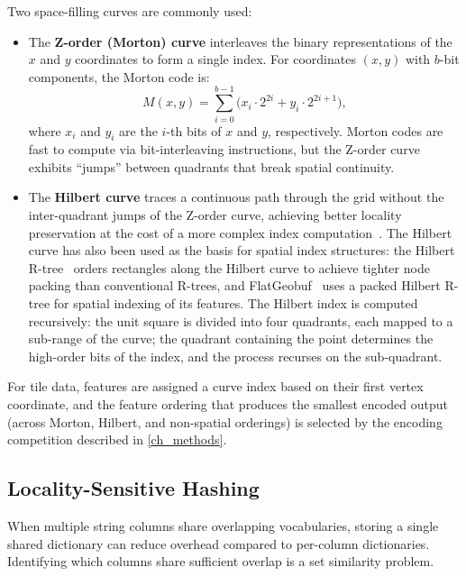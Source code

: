 Two space-filling curves are commonly used:

\begin{itemize}
    \item The \textbf{Z-order (Morton) curve} interleaves the binary representations of the $x$ and $y$ coordinates to form a single index.
    For coordinates $(x, y)$ with $b$-bit components, the Morton code is:
    \begin{equation}\label{eq:morton}
        M(x, y) = \sum_{i=0}^{b-1} \bigl( x_i \cdot 2^{2i} + y_i \cdot 2^{2i+1} \bigr),
    \end{equation}
    where $x_i$ and $y_i$ are the $i$-th bits of $x$ and $y$, respectively.
    Morton codes are fast to compute via bit-interleaving instructions, but the Z-order curve exhibits \enquote{jumps} between quadrants that break spatial continuity.

    \item The \textbf{Hilbert curve} traces a continuous path through the grid without the inter-quadrant jumps of the Z-order curve, achieving better locality preservation at the cost of a more complex index computation~\cite{moonAnalysisClusteringProperties2001}.
    The Hilbert curve has also been used as the basis for spatial index structures: the Hilbert R-tree~\cite{kamelHilbertRtreeImproved1994} orders rectangles along the Hilbert curve to achieve tighter node packing than conventional R-trees, and FlatGeobuf~\cite{flatgeobuf2018} uses a packed Hilbert R-tree for spatial indexing of its features.
    The Hilbert index is computed recursively: the unit square is divided into four quadrants, each mapped to a sub-range of the curve; the quadrant containing the point determines the high-order bits of the index, and the process recurses on the sub-quadrant.
\end{itemize}

For tile data, features are assigned a curve index based on their first vertex coordinate, and the feature ordering that produces the smallest encoded output (across Morton, Hilbert, and non-spatial orderings) is selected by the encoding competition described in \cref{ch_methods}.

\subsection{Locality-Sensitive Hashing}\label{sub_lsh}

When multiple string columns share overlapping vocabularies, storing a single shared dictionary can reduce overhead compared to per-column dictionaries.
Identifying which columns share sufficient overlap is a set similarity problem.

